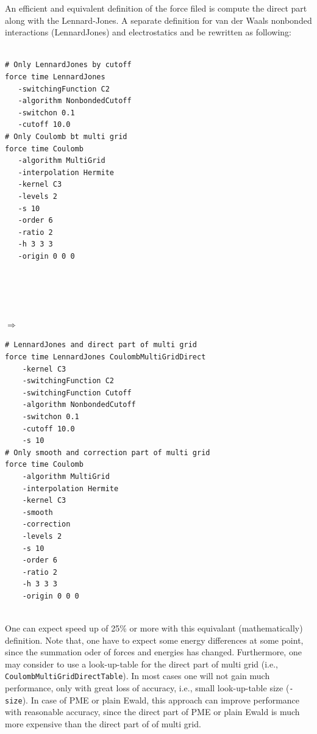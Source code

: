 \documentclass[11pt]{article}
\begin{document}
An efficient and equivalent definition of the force filed is compute the
direct part along with the Lennard-Jones. A separate definition for van
der Waals nonbonded interactions (LennardJones) and electrostatics and
be rewritten as following:\\~\\
\small
\begin{minipage}[htb]{6cm} 
\begin{verbatim}
# Only LennardJones by cutoff
force time LennardJones  
   -switchingFunction C2 
   -algorithm NonbondedCutoff
   -switchon 0.1
   -cutoff 10.0
# Only Coulomb bt multi grid
force time Coulomb 
   -algorithm MultiGrid 
   -interpolation Hermite 
   -kernel C3
   -levels 2
   -s 10
   -order 6
   -ratio 2
   -h 3 3 3
   -origin 0 0 0





\end{verbatim}
\end{minipage} 
\normalsize
 $\Rightarrow$ \,
\small
\begin{minipage}[htb]{12cm}
\begin{verbatim}
# LennardJones and direct part of multi grid
force time LennardJones CoulombMultiGridDirect 
    -kernel C3 
    -switchingFunction C2 
    -switchingFunction Cutoff 
    -algorithm NonbondedCutoff
    -switchon 0.1
    -cutoff 10.0
    -s 10
# Only smooth and correction part of multi grid
force time Coulomb 
    -algorithm MultiGrid 
    -interpolation Hermite 
    -kernel C3  
    -smooth 
    -correction
    -levels 2
    -s 10
    -order 6
    -ratio 2
    -h 3 3 3
    -origin 0 0 0
\end{verbatim}
\end{minipage}
\normalsize\\

One can expect speed up of 25\% or more with this equivalant
(mathematically) definition. Note that, one have to expect some
energy differences at some point, since the summation oder of forces
and energies has changed. Furthermore, one may consider to use a
look-up-table for the direct part of multi grid (i.e.,
\texttt{CoulombMultiGridDirectTable}). In most cases one will not
gain much performance, only with great loss of accuracy, i.e., small
look-up-table size (\texttt{-size}). In case of PME or plain Ewald,
this approach can improve performance with reasonable accuracy, since
the direct part of PME or plain Ewald is much more expensive than the
direct part of of multi grid.
\end{document}
